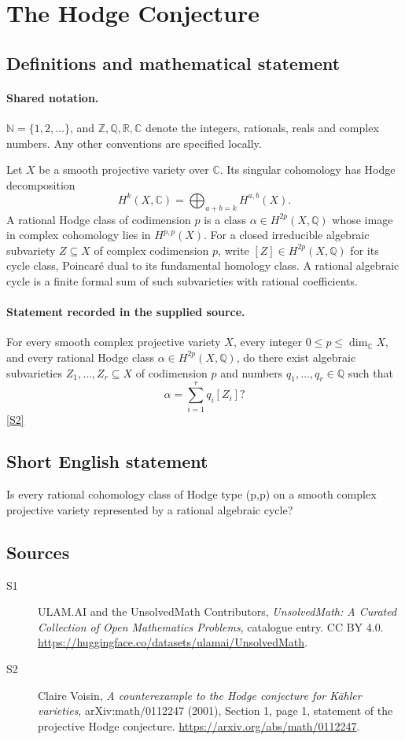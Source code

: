 \documentclass[11pt]{article}
\newcommand{\sref}[2]{\hyperlink{source:#1:#2}{[S#2]}}
\begin{document}
\section{The Hodge Conjecture}\label{statement}

\subsection{Definitions and mathematical statement}

\paragraph{Shared notation.}$\mathbb N=\{1,2,\ldots\}$, and $\mathbb Z,\mathbb Q,\mathbb R,\mathbb C$ denote the integers, rationals, reals and complex numbers. Any other conventions are specified locally.


Let \(X\) be a smooth projective variety over \(\mathbb C\).
Its singular cohomology has Hodge decomposition
\[
 H^k(X,\mathbb C)=\bigoplus_{a+b=k}H^{a,b}(X).
\]
A rational Hodge class of codimension \(p\) is a class
\(\alpha\in H^{2p}(X,\mathbb Q)\) whose image in complex cohomology
lies in \(H^{p,p}(X)\).  For a closed irreducible algebraic subvariety
\(Z\subseteq X\) of complex codimension \(p\), write
\([Z]\in H^{2p}(X,\mathbb Q)\) for its cycle class, Poincar\'e dual to
its fundamental homology class.  A rational algebraic cycle is a finite
formal sum of such subvarieties with rational coefficients.
\paragraph{Statement recorded in the supplied source.}
For every smooth complex projective variety \(X\), every integer
\(0\le p\le\dim_{\mathbb C}X\), and every rational Hodge class
\(\alpha\in H^{2p}(X,\mathbb Q)\), do there exist algebraic subvarieties
\(Z_1,\ldots,Z_r\subseteq X\) of codimension \(p\) and numbers
\(q_1,\ldots,q_r\in\mathbb Q\) such that
\[
 \alpha=\sum_{i=1}^{r}q_i[Z_i]?
\] \sref{statement}{2}
\subsection{Short English statement}
Is every rational cohomology class of Hodge type (p,p) on a smooth complex projective variety represented by a rational algebraic cycle?
\subsection{Sources}
\begin{description}
\item[\hypertarget{source:statement:1}{S1}] ULAM.AI and the UnsolvedMath Contributors, \emph{UnsolvedMath: A Curated Collection of Open Mathematics Problems}, catalogue entry. CC BY 4.0. \url{https://huggingface.co/datasets/ulamai/UnsolvedMath}.
\item[\hypertarget{source:statement:2}{S2}] Claire Voisin, \emph{A counterexample to the Hodge conjecture for K\"ahler varieties}, arXiv:math/0112247 (2001), Section 1, page 1, statement of the projective Hodge conjecture. \url{https://arxiv.org/abs/math/0112247}.
\end{description}
\label{end:statement}
\end{document}
